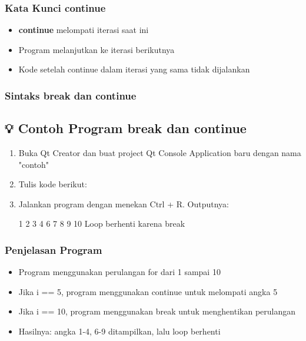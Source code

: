\subsubsection{Kata Kunci continue}

\begin{itemize}
\item \textbf{continue} melompati iterasi saat ini
\item Program melanjutkan ke iterasi berikutnya
\item Kode setelah continue dalam iterasi yang sama tidak dijalankan
\end{itemize}

\subsubsection{Sintaks break dan continue}



\subsection{💡 Contoh Program break dan continue}

\begin{enumerate}
\item Buka Qt Creator dan buat project Qt Console Application baru dengan nama "contoh"
\item Tulis kode berikut:



\item Jalankan program dengan menekan Ctrl + R. Outputnya:

\begin{lcverbatim}
1 2 3 4 6 7 8 9 10
Loop berhenti karena break
\end{lcverbatim}
\end{enumerate}

\subsubsection*{Penjelasan Program}
\begin{itemize}
\item Program menggunakan perulangan for dari 1 sampai 10
\item Jika i == 5, program menggunakan continue untuk melompati angka 5
\item Jika i == 10, program menggunakan break untuk menghentikan perulangan
\item Hasilnya: angka 1-4, 6-9 ditampilkan, lalu loop berhenti
\end{itemize}

